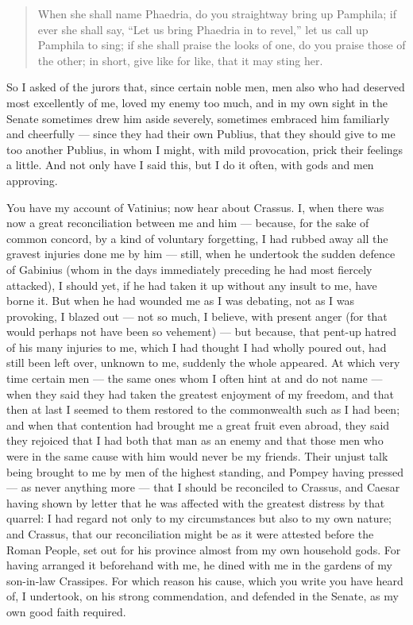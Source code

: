 \begin{quote}
When she shall name Phaedria, do you straightway bring up Pamphila; if ever she shall say, ``Let us bring Phaedria in to revel,'' let us call up Pamphila to sing; if she shall praise the looks of one, do you praise those of the other; in short, give like for like, that it may sting her.
\end{quote}

So I asked of the jurors that, since certain noble men, men also who had deserved most excellently of me, loved my enemy too much, and in my own sight in the Senate sometimes drew him aside severely, sometimes embraced him familiarly and cheerfully --- since they had their own Publius, that they should give to me too another Publius, in whom I might, with mild provocation, prick their feelings a little. And not only have I said this, but I do it often, with gods and men approving.

 You have my account of Vatinius; now hear about Crassus. I, when there was now a great reconciliation between me and him --- because, for the sake of common concord, by a kind of voluntary forgetting, I had rubbed away all the gravest injuries done me by him --- still, when he undertook the sudden defence of Gabinius (whom in the days immediately preceding he had most fiercely attacked), I should yet, if he had taken it up without any insult to me, have borne it. But when he had wounded me as I was debating, not as I was provoking, I blazed out --- not so much, I believe, with present anger (for that would perhaps not have been so vehement) --- but because, that pent-up hatred of his many injuries to me, which I had thought I had wholly poured out, had still been left over, unknown to me, suddenly the whole appeared. At which very time certain men --- the same ones whom I often hint at and do not name --- when they said they had taken the greatest enjoyment of my freedom, and that then at last I seemed to them restored to the commonwealth such as I had been; and when that contention had brought me a great fruit even abroad, they said they rejoiced that I had both that man as an enemy and that those men who were in the same cause with him would never be my friends. Their unjust talk being brought to me by men of the highest standing, and Pompey having pressed --- as never anything more --- that I should be reconciled to Crassus, and Caesar having shown by letter that he was affected with the greatest distress by that quarrel: I had regard not only to my circumstances but also to my own nature; and Crassus, that our reconciliation might be as it were attested before the Roman People, set out for his province almost from my own household gods. For having arranged it beforehand with me, he dined with me in the gardens of my son-in-law Crassipes. For which reason his cause, which you write you have heard of, I undertook, on his strong commendation, and defended in the Senate, as my own good faith required.

